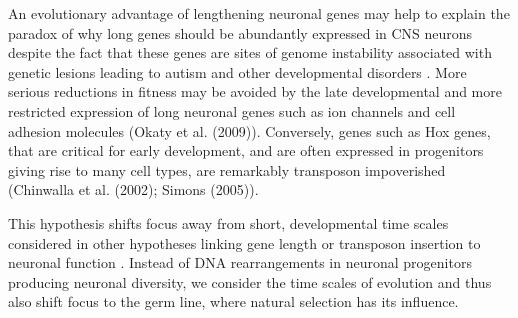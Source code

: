 An evolutionary advantage of lengthening neuronal genes may help to explain the paradox of why long genes should be abundantly expressed in CNS neurons despite the fact that these genes are sites of genome instability associated with genetic lesions leading to autism and other developmental disorders \cite{Wei_2016}. More serious reductions in fitness may be avoided by the late developmental and more restricted expression of long neuronal genes such as ion channels and cell adhesion molecules (Okaty et al. (2009)). Conversely, genes such as Hox genes, that are critical for early development, and are often expressed in progenitors giving rise to many cell types, are remarkably transposon impoverished (Chinwalla et al. (2002); Simons (2005)).

This hypothesis shifts focus away from short, developmental time scales considered in other hypotheses linking gene length or transposon insertion to neuronal function \cite{Muotri_2005}\cite{Richardson_2014}\cite{Perrat_2013}. Instead of DNA rearrangements in neuronal progenitors producing neuronal diversity, we consider the time scales of evolution and thus also shift focus to the germ line, where natural selection has its influence. 

